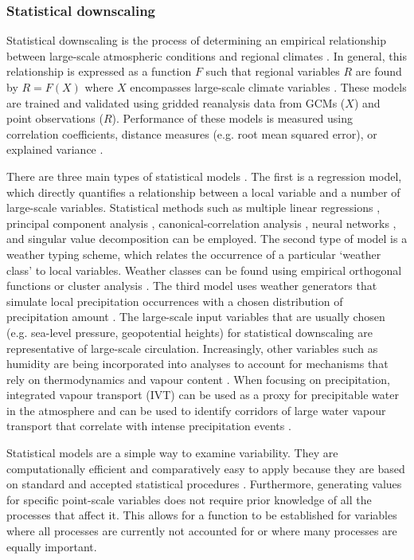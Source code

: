 \documentclass[12pt]{article}
\begin{document}
\subsubsection{Statistical downscaling}
Statistical downscaling is the process of determining an empirical relationship between large-scale atmospheric conditions and regional climates \citep{Fowler2007}. In general, this relationship is expressed as a function $F$ such that regional variables $R$ are found by $R=F(X)$ where $X$ encompasses large-scale climate variables \citep{Fowler2007}. These models are trained and validated using gridded reanalysis data from GCMs ($X$) and point observations ($R$). Performance of these models is measured using correlation coefficients, distance measures (e.g. root mean squared error), or explained variance \citep{Fowler2007}. 

There are three main types of statistical models \citep{Fowler2007}. The first is a regression model, which directly quantifies a relationship between a local variable and a number of large-scale variables. Statistical methods such as multiple linear regressions \citep{Hanssen-Bauer1998}, principal component analysis \citep{Kidson1998}, canonical-correlation analysis \citep{Busuioc2001}, neural networks \citep{Zorita1999}, and singular value decomposition \citep{Widmann2003} can be employed.  The second type of model is a weather typing scheme, which relates the occurrence of a particular `weather class' to local variables. Weather classes can be found using empirical orthogonal functions or cluster analysis \citep{Fowler2007}. The third model uses weather generators that simulate local precipitation occurrences with a chosen distribution of precipitation amount \citep{Fowler2007}. The large-scale input variables that are usually chosen (e.g. sea-level pressure, geopotential heights) for statistical downscaling are representative of large-scale circulation. Increasingly, other variables such as humidity are being incorporated into analyses to account for mechanisms that rely on thermodynamics and vapour content \citep{Fowler2007}. When focusing on precipitation, integrated vapour transport (IVT) can be used as a proxy for precipitable water in the atmosphere and can be used to identify corridors of large water vapour transport that correlate with intense precipitation events \citep{Neiman2008}. 

Statistical models are a simple way to examine variability. They are computationally efficient and comparatively easy to apply because they are based on standard and accepted statistical procedures \citep{Fowler2007}. Furthermore, generating values for specific point-scale variables does not require prior knowledge of all the processes that affect it. This allows for a function to be established for variables where all processes are currently not accounted for or where many processes are equally important. 
\end{document}
